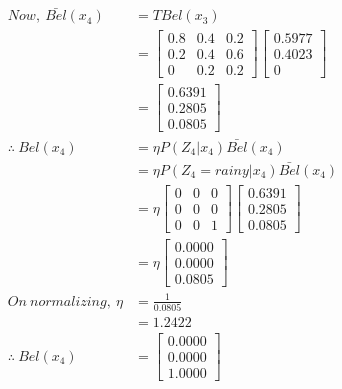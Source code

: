 \documentclass[a4paper,fleqn,11pt]{article}
\theoremstyle{mytheor}
\begin{document}
\begin{align*}
Now,\ \bar{Bel}(x_4) & = T Bel (x_3) \\
					  & = \begin{bmatrix}
								0.8 & 0.4 & 0.2 \\
								0.2 & 0.4 & 0.6 \\
								0   & 0.2 & 0.2
						  \end{bmatrix}
					  	  \begin{bmatrix}
								0.5977 \\
								0.4023 \\
								0
						   \end{bmatrix} \\
					 & = \begin{bmatrix}
							0.6391 \\
							0.2805 \\
							0.0805
						 \end{bmatrix} \\
\therefore\ Bel(x_4) & = \eta P (Z_4 | x_{4}) \bar{Bel} (x_{4}) \\
					  & = \eta P (Z_4 = rainy | x_{4}) \bar{Bel} (x_{4}) \\
					  & = \eta 
					  	  \begin{bmatrix}
						  	  	0 & 0 & 0 \\
					  		  	0 & 0 & 0 \\
					  	  		0 & 0 & 1
					  	  \end{bmatrix}
					  	  \begin{bmatrix}
								0.6391 \\
								0.2805 \\
								0.0805
						 \end{bmatrix} \\
					   & = \eta
					 	   \begin{bmatrix}
								0.0000 \\
								0.0000 \\
								0.0805
						   \end{bmatrix} \\
On\ normalizing,\ \eta & = \frac{1}{0.0805} \\
& = 1.2422\\
\therefore\ Bel(x_4) & = \begin{bmatrix}
								0.0000 \\
								0.0000 \\
								1.0000
						   \end{bmatrix} \\

\end{align*}
\end{document}
